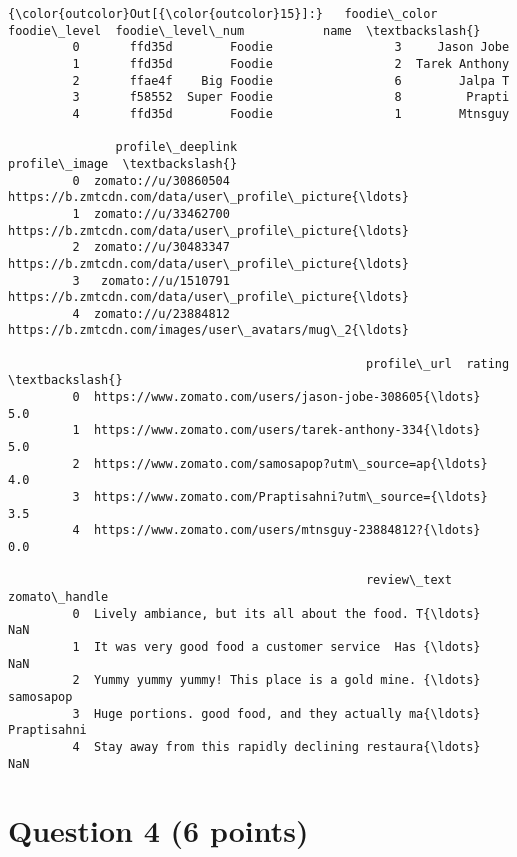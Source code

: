 \documentclass[11pt]{article}
\begin{document}
\begin{Verbatim}[commandchars=\\\{\}]
{\color{outcolor}Out[{\color{outcolor}15}]:}   foodie\_color  foodie\_level  foodie\_level\_num           name  \textbackslash{}
         0       ffd35d        Foodie                 3     Jason Jobe   
         1       ffd35d        Foodie                 2  Tarek Anthony   
         2       ffae4f    Big Foodie                 6        Jalpa T   
         3       f58552  Super Foodie                 8         Prapti   
         4       ffd35d        Foodie                 1        Mtnsguy   
         
               profile\_deeplink                                      profile\_image  \textbackslash{}
         0  zomato://u/30860504  https://b.zmtcdn.com/data/user\_profile\_picture{\ldots}   
         1  zomato://u/33462700  https://b.zmtcdn.com/data/user\_profile\_picture{\ldots}   
         2  zomato://u/30483347  https://b.zmtcdn.com/data/user\_profile\_picture{\ldots}   
         3   zomato://u/1510791  https://b.zmtcdn.com/data/user\_profile\_picture{\ldots}   
         4  zomato://u/23884812  https://b.zmtcdn.com/images/user\_avatars/mug\_2{\ldots}   
         
                                                  profile\_url  rating  \textbackslash{}
         0  https://www.zomato.com/users/jason-jobe-308605{\ldots}     5.0   
         1  https://www.zomato.com/users/tarek-anthony-334{\ldots}     5.0   
         2  https://www.zomato.com/samosapop?utm\_source=ap{\ldots}     4.0   
         3  https://www.zomato.com/Praptisahni?utm\_source={\ldots}     3.5   
         4  https://www.zomato.com/users/mtnsguy-23884812?{\ldots}     0.0   
         
                                                  review\_text zomato\_handle  
         0  Lively ambiance, but its all about the food. T{\ldots}           NaN  
         1  It was very good food a customer service  Has {\ldots}           NaN  
         2  Yummy yummy yummy! This place is a gold mine. {\ldots}     samosapop  
         3  Huge portions. good food, and they actually ma{\ldots}   Praptisahni  
         4  Stay away from this rapidly declining restaura{\ldots}           NaN  
\end{Verbatim}
            
    \hypertarget{question-4-6-points}{%
\section{Question 4 (6 points)}\label{question-4-6-points}}
\end{document}
